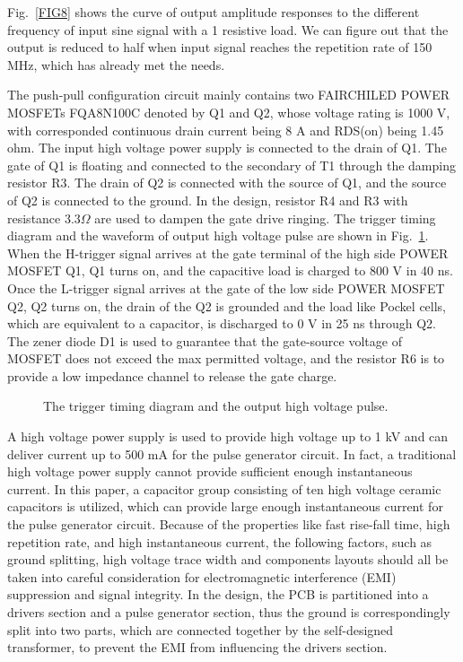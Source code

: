 \documentclass[aip,rsi,reprint,graphicx]{revtex4-1} %
\begin{document}
 Fig.~\ref{FIG8} shows the curve of output amplitude responses to the different frequency of input sine signal with a 1 resistive load.
 We can figure out that the output is reduced to half when input signal reaches the repetition rate of 150 MHz, which has already met the needs.


The push-pull configuration circuit mainly contains two FAIRCHILED POWER MOSFETs FQA8N100C denoted by Q1 and Q2, whose voltage rating is 1000 V, with corresponded continuous drain current being 8 A and RDS(on) being 1.45 ohm.
The input high voltage power supply is connected to the drain of Q1. The gate of Q1 is floating and connected to the secondary of T1 through the damping resistor R3. 
The drain of Q2 is connected with the source of Q1, and the source of Q2 is connected to the ground. 
In the design, resistor R4 and R3 with resistance $3.3 \Omega$ are used to dampen the gate drive ringing.
The trigger timing diagram and the waveform of output high voltage pulse are shown in Fig.~\ref{FIG2}. 
When the H-trigger signal arrives at the gate terminal of the high side POWER MOSFET Q1, Q1 turns on, and the capacitive load is charged to 800 V in 40 ns. 
Once the L-trigger signal arrives at the gate of the low side POWER MOSFET Q2, Q2 turns on, the drain of the Q2 is grounded and the load like Pockel cells, which are equivalent to a capacitor, is discharged to 0 V in 25 ns through Q2. 
The zener diode D1 is used to guarantee that the gate-source voltage of MOSFET does not exceed the max permitted voltage, and the resistor R6 is to provide a low impedance channel to release the gate charge.
\begin{figure}[hbt]
\caption{The trigger timing diagram and the output high voltage pulse. \label{FIG2}}%
\end{figure}

	A high voltage power supply is used to provide high voltage up to 1 kV and can deliver current up to 500 mA for the pulse generator circuit. 
In fact, a traditional high voltage power supply cannot provide sufficient enough instantaneous current. 
In this paper, a capacitor group consisting of ten high voltage ceramic capacitors is utilized, which can provide large enough instantaneous current for the pulse generator circuit.
Because of the properties like fast rise-fall time, high repetition rate, and high instantaneous current, the following factors,  such as ground splitting, high voltage trace width and components layouts should all be taken into careful consideration for electromagnetic interference (EMI) suppression and signal integrity.
In the design, the PCB is partitioned into a drivers section and a pulse generator section, thus the ground is correspondingly split into two parts, which are connected together by the self-designed transformer, to prevent the EMI from influencing the drivers section.
\end{document}
